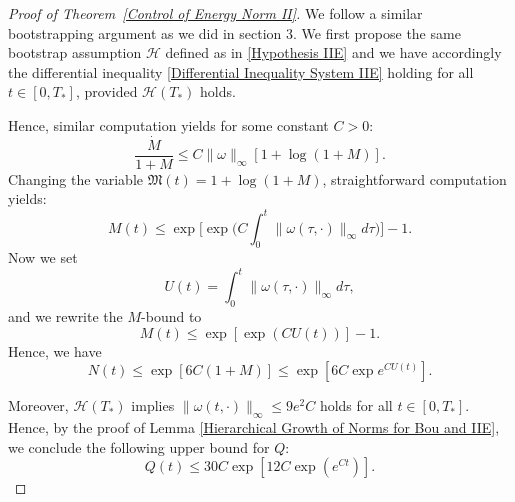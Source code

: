\documentclass[12pt,letterpaper]{article}
\theoremstyle{plain}
\begin{document}
\begin{proof}[Proof of Theorem~\ref{Control of Energy Norm II}]

We follow a similar bootstrapping argument as we did in section 3. We first propose the same bootstrap assumption $\mathscr H$ defined as in \eqref{Hypothesis IIE} and we have accordingly the differential inequality \eqref{Differential Inequality System IIE} holding for all $t\in [0,T_*]$, provided $\mathscr H(T_*)$ holds.

Hence, similar computation yields for some constant $C>0$:
    \begin{equation*}
        \frac{\dot M}{1+M}\le C\lVert\omega\rVert_\infty[1+\log(1+M)].
    \end{equation*}
    Changing the variable $\mathfrak M(t)=1+\log (1+M)$, straightforward computation yields:
    \begin{equation*}
     M(t)\le \exp\Big[\exp\Big(C\int_0^t\lVert\omega(\tau,\cdot)\rVert_\infty d\tau\Big)\Big]-1.
    \end{equation*}
    Now we set
    \begin{equation*}
     U(t)=\int_0^t \lVert\omega(\tau,\cdot)\rVert_\infty d\tau ,  
    \end{equation*}
    and we rewrite the $M$-bound to
    \begin{equation*}
      M(t)\le  \exp[\exp(CU(t))]-1.
    \end{equation*}
    Hence, we have
    \begin{equation*}
    N(t)\le  \exp[6C(1+M)]\le \exp[6C\exp e^{ CU(t)}].
    \end{equation*}

    Moreover, $\mathscr H(T_*)$ implies $\lVert\omega(t,\cdot)\rVert_\infty\le 9e^2C$ holds for all $t\in [0,T_*]$. Hence, by the proof of Lemma \ref{Hierarchical Growth of Norms for Bou and IIE}, we conclude the following upper bound for $Q$:
    \begin{equation*}
     Q(t)\le  30C\exp[12C\exp (e^{Ct})].
    \end{equation*}


\end{proof}
\end{document}

